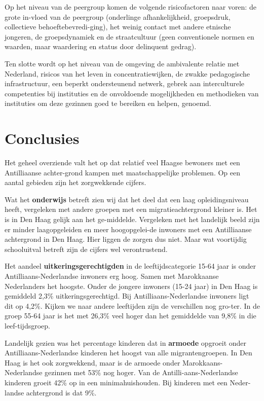 \documentclass[]{book}
\begin{document}
Op het niveau van de peergroup komen de volgende risicofactoren naar
voren: de grote in-vloed van de peergroup (onderlinge afhankelijkheid,
groepsdruk, collectieve behoeftebevredi-ging), het weinig contact met
andere etnische jongeren, de groepsdynamiek en de straatcultuur (geen
conventionele normen en waarden, maar waardering en status door
delinquent gedrag).

Ten slotte wordt op het niveau van de omgeving de ambivalente relatie
met Nederland, risicos van het leven in concentratiewijken, de zwakke
pedagogische infrastructuur, een beperkt ondersteunend netwerk, gebrek
aan interculturele competenties bij instituties en de onvoldoende
mogelijkheden en methodieken van instituties om deze gezinnen goed te
bereiken en helpen, genoemd.

\hypertarget{conclusies}{%
\chapter*{Conclusies}\label{conclusies}}

Het geheel overziende valt het op dat relatief veel Haagse bewoners met
een Antilliaanse achter-grond kampen met maatschappelijke problemen. Op
een aantal gebieden zijn het zorgwekkende cijfers.

Wat het \textbf{onderwijs} betreft zien wij dat het deel dat een laag
opleidingsniveau heeft, vergeleken met andere groepen met een
migratieachtergrond kleiner is. Het is in Den Haag gelijk aan het
ge-middelde. Vergeleken met het landelijk beeld zijn er minder
laagopgeleiden en meer hoogopgelei-de inwoners met een Antilliaanse
achtergrond in Den Haag. Hier liggen de zorgen dus niet. Maar wat
voortijdig schooluitval betreft zijn de cijfers wel verontrustend.

Het aandeel \textbf{uitkeringsgerechtigden} in de leeftijdscategorie
15-64 jaar is onder Antilliaans-Nederlandse inwoners erg hoog. Samen met
Marokkaanse Nederlanders het hoogste. Onder de jongere inwoners (15-24
jaar) in Den Haag is gemiddeld 2,3\% uitkeringsgerechtigd. Bij
Antilliaans-Nederlandse inwoners ligt dit op 4,2\%. Kijken we naar
andere leeftijden zijn de verschillen nog gro-ter. In de groep 55-64
jaar is het met 26,3\% veel hoger dan het gemiddelde van 9,8\% in die
leef-tijdsgroep.

Landelijk gezien was het percentage kinderen dat in \textbf{armoede}
opgroeit onder Antilliaans-Nederlandse kinderen het hoogst van alle
migrantengroepen. In Den Haag is het ook zorgwekkend, maar is de armoede
onder Marokkaans-Nederlandse gezinnen met 53\% nog hoger. Van de
Antilli-aans-Nederlandse kinderen groeit 42\% op in een
minimahuishouden. Bij kinderen met een Neder-landse achtergrond is dat
9\%.
\end{document}
